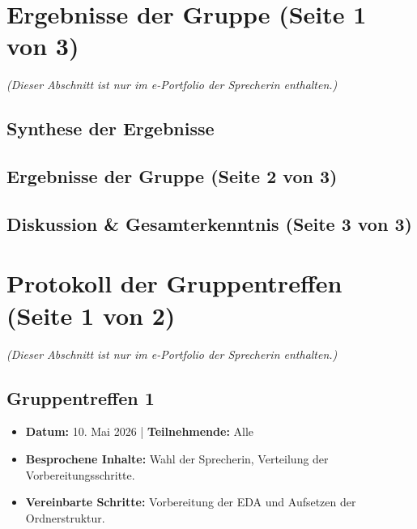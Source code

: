 \documentclass[11pt,a4paper]{article}
\newif\ifsprecherin
\begin{document}
\section{Ergebnisse der Gruppe (Seite 1 von 3)}
\label{sec:gruppenergebnisse}

\textit{(Dieser Abschnitt ist nur im e-Portfolio der Sprecherin enthalten.)}

\subsection{Synthese der Ergebnisse}
\lipsum[12-14]

\newpage
\subsection*{Ergebnisse der Gruppe (Seite 2 von 3)}
\lipsum[15-17]

\newpage
\subsection{Diskussion \& Gesamterkenntnis (Seite 3 von 3)}
\lipsum[18-20]

\newpage
\fi

\ifsprecherin
\section{Protokoll der Gruppentreffen (Seite 1 von 2)}
\label{sec:protokoll}

\textit{(Dieser Abschnitt ist nur im e-Portfolio der Sprecherin enthalten.)}

\subsection*{Gruppentreffen 1}
\begin{itemize}[leftmargin=*]
    \item \textbf{Datum:} 10. Mai 2026 | \textbf{Teilnehmende:} Alle
    \item \textbf{Besprochene Inhalte:} Wahl der Sprecherin, Verteilung der Vorbereitungsschritte.
    \item \textbf{Vereinbarte Schritte:} Vorbereitung der EDA und Aufsetzen der Ordnerstruktur.
\end{itemize}
\end{document}
